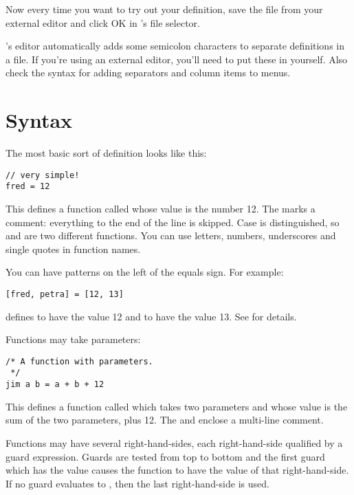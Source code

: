 Now every time you want to try out your definition, save the file from your
external editor and click OK in \nip{}'s file selector. 

\nip{}'s editor automatically adds some semicolon characters to separate
definitions in a file. If you're using an external editor, you'll need to put
these in yourself. Also check the syntax for adding separators and column
items to menus.

\section{Syntax}

The most basic sort of definition looks like this:

\begin{verbatim}
// very simple!
fred = 12
\end{verbatim}

\noindent
This defines a function called  whose value is the number 12. The
\ct{//} marks a comment: everything to the end of the line is skipped.
Case is distinguished, so  and  are two different functions.
You can use letters, numbers, underscores and single quotes in function names.

You can have patterns on the left of the equals sign. For example:

\begin{verbatim}
[fred, petra] = [12, 13]
\end{verbatim}

\noindent
defines  to have the value 12 and  to have the value 13.
See  for details.

Functions may take parameters:

\begin{verbatim}
/* A function with parameters.
 */
jim a b = a + b + 12
\end{verbatim}

\noindent
This defines a function called  which takes two parameters and whose
value is the sum of the two parameters, plus 12. The \ct{/*} and \ct{*/}
enclose a multi-line comment.

Functions may have several right-hand-sides, each right-hand-side qualified by
a guard expression. Guards are tested from top to bottom and the first guard
which has the value  causes the function to have the value of that
right-hand-side. If no guard evaluates to , then the last
right-hand-side is used.

